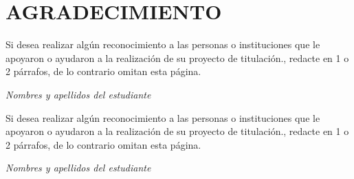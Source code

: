 \documentclass[12pt, a4paper, nofontenc, numbers=endperiod]{apa7}
\begin{document}
	{ %
		\section*{\large \centering AGRADECIMIENTO}
		\vspace*{3cm}
		\begin{flushright}
			\begin{minipage}[b]{7.5cm}	
				Si desea realizar algún reconocimiento a las personas o instituciones que le apoyaron o ayudaron a la realización de su proyecto de titulación., redacte en 1 o 2 párrafos, de lo contrario omitan esta página. \\ [-1cm]	
			\end{minipage}	
		\end{flushright}
		\begin{flushright}
			\textit{Nombres y apellidos del estudiante} \\ 
		\end{flushright}
		\vspace*{3cm}
		\begin{flushright}
			\begin{minipage}[b]{7.5cm}	
				{\color{red} Si desea realizar algún reconocimiento a las personas o instituciones que le apoyaron o ayudaron a la realización de su proyecto de titulación., redacte en 1 o 2 párrafos, de lo contrario omitan esta página.}
			\end{minipage}
		\end{flushright}
		\begin{flushright}
			\textit{{\color{red}Nombres y apellidos del estudiante}} \\ 
		\end{flushright}
	}
	\newpage
\end{document}
